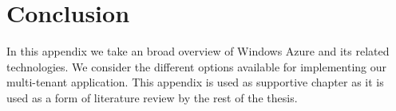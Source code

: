\section{Conclusion}

In this appendix we take an broad overview of Windows Azure and its related technologies. We consider the different options available for implementing our multi-tenant application. This appendix is used as supportive  chapter as it is used as a form of literature review by the rest of the thesis. 


